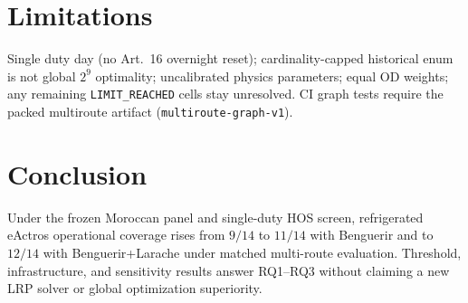 \documentclass[review,12pt]{elsarticle}
\begin{document}
\section{Limitations}
\label{sec:limits}
Single duty day (no Art.~16 overnight reset); cardinality-capped historical enum is not global $2^{9}$ optimality;
uncalibrated physics parameters; equal OD weights;
any remaining \texttt{LIMIT\_REACHED} cells stay unresolved.
CI graph tests require the packed multiroute artifact (\texttt{multiroute-graph-v1}).

\section{Conclusion}
\label{sec:conclusion}
Under the frozen Moroccan panel and single-duty HOS screen, refrigerated eActros operational coverage rises from $9/14$ to $11/14$ with Benguerir and to $12/14$ with Benguerir+Larache under matched multi-route evaluation.
Threshold, infrastructure, and sensitivity results answer RQ1--RQ3 without claiming a new LRP solver or global optimization superiority.



\end{document}
